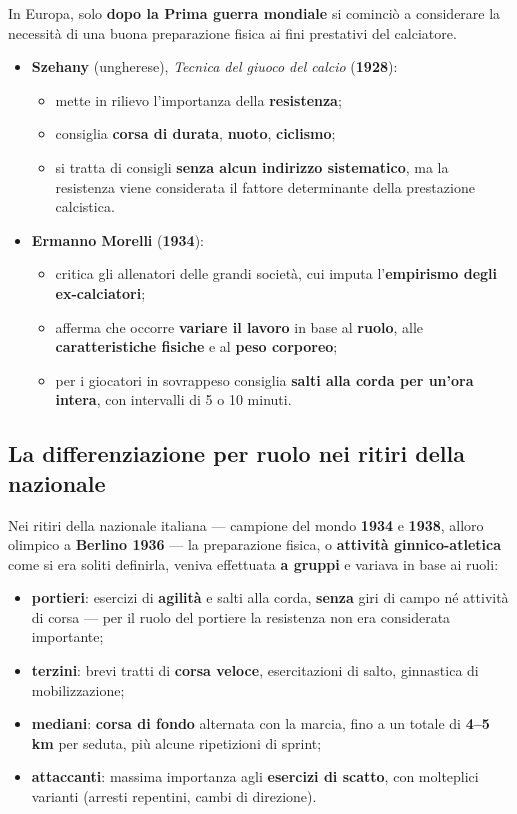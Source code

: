 In Europa, solo \textbf{dopo la Prima guerra mondiale} si cominciò a considerare la necessità di una
buona preparazione fisica ai fini prestativi del calciatore.

\begin{itemize}
  \item \textbf{Szehany} (ungherese), \textit{Tecnica del giuoco del calcio} (\textbf{1928}):
    \begin{itemize}
      \item mette in rilievo l'importanza della \textbf{resistenza};
      \item consiglia \textbf{corsa di durata}, \textbf{nuoto}, \textbf{ciclismo};
      \item si tratta di consigli \textbf{senza alcun indirizzo sistematico}, ma la resistenza
        viene considerata il fattore determinante della prestazione calcistica.
    \end{itemize}
  \item \textbf{Ermanno Morelli} (\textbf{1934}):
    \begin{itemize}
      \item critica gli allenatori delle grandi società, cui imputa l'\textbf{empirismo degli
        ex-calciatori};
      \item afferma che occorre \textbf{variare il lavoro} in base al \textbf{ruolo}, alle
        \textbf{caratteristiche fisiche} e al \textbf{peso corporeo};
      \item per i giocatori in sovrappeso consiglia \textbf{salti alla corda per un'ora intera},
        con intervalli di 5 o 10 minuti.
    \end{itemize}
\end{itemize}

\subsection{La differenziazione per ruolo nei ritiri della nazionale}

Nei ritiri della nazionale italiana --- campione del mondo \textbf{1934} e \textbf{1938}, alloro
olimpico a \textbf{Berlino 1936} --- la preparazione fisica, o \textbf{attività ginnico-atletica}
come si era soliti definirla, veniva effettuata \textbf{a gruppi} e variava in base ai ruoli:

\begin{itemize}
  \item \textbf{portieri}: esercizi di \textbf{agilità} e salti alla corda, \textbf{senza} giri di
    campo né attività di corsa --- per il ruolo del portiere la resistenza non era considerata
    importante;
  \item \textbf{terzini}: brevi tratti di \textbf{corsa veloce}, esercitazioni di salto, ginnastica
    di mobilizzazione;
  \item \textbf{mediani}: \textbf{corsa di fondo} alternata con la marcia, fino a un totale di
    \textbf{4--5 km} per seduta, più alcune ripetizioni di sprint;
  \item \textbf{attaccanti}: massima importanza agli \textbf{esercizi di scatto}, con molteplici
    varianti (arresti repentini, cambi di direzione).
\end{itemize}

